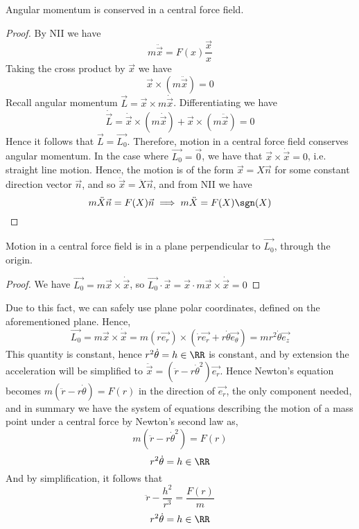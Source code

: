 \begin{theorem}
  Angular momentum is conserved in a central force field.
\end{theorem}
\begin{proof}
  By NII we have 
  \[m\ddot{\vec{x}}= F(x)\frac{\vec{x}}{x}\]
  Taking the cross product by $\vec{x}$ we have 
  \[\vec{x}\times (m\ddot{\vec{x}}) = 0\]
  Recall angular momentum $\vec{L}=\vec{x}\times m\dot{\vec{x}}$.
  Differentiating we have 
  \[\dot{\vec{L}}=\dot{\vec{x}}\times (m\dot{\vec{x}}) + \vec{x}\times
  (m\ddot{\vec{x}})=0\]
  Hence it follows that $\vec{L}=\vec{L_0}$. Therefore, motion in a central
  force field conserves angular momentum. In the case where $\vec{L_0}=\vec{0}$,
  we have that $\vec{x}\times\dot{\vec{x}}=0$, i.e. straight line motion. Hence,
  the motion is of the form $\vec{x}=X\vec{n}$ for some constant direction
  vector $\vec{n}$, and so $\ddot{\vec{x}}=\ddot{X}\vec{n}$, and from NII we
  have 
  \[m\ddot{X}\vec{n} = F(X)\vec{n} \implies m\ddot{X}=F(X)\sgn(X)\]
\end{proof}

\begin{theorem}
  Motion in a central force field is in a plane perpendicular to $\vec{L_0}$,
  through the origin.
\end{theorem}
\begin{proof}
  We have $\vec{L_0}=m\vec{x}\times\dot{\vec{x}}$, so
  $\vec{L_0}\cdot\vec{x}=\vec{x}\cdot m\vec{x}\times\dot{\vec{x}}=0$
\end{proof}
Due to this fact, we can safely use plane polar coordinates, defined on the
aforementioned plane. Hence,
\[\vec{L_0} = m\vec{x}\times \dot{\vec{x}} = m(r\vec{e_r}) \times
(\dot{r}\vec{e_r} + r\dot{\theta}\vec{e_{\theta}}) = mr^2\dot{\theta}\vec{e_z}\]
This quantity is constant, hence $r^2\dot{\theta}=h\in\RR$ is constant, and by extension
the acceleration will be simplified to $\ddot{\vec{x}} =
(\ddot{r}-r\dot{\theta}^2)\vec{e_r}$. Hence Newton's equation becomes
$m(\ddot{r}-r\dot{\theta})=F(r)$ in the direction of $\vec{e_r}$, the only
component needed, and in summary we have the system of equations describing the
motion of a mass point under a central force by Newton's second law as,
\[m(\ddot{r}-r\dot{\theta}^2)=F(r)\]
\[r^2\dot{\theta}=h\in\RR\]
And by simplification, it follows that 
\[\ddot{r}- \frac{h^2}{r^3}=\frac{F(r)}{m}\]
\[r^2\dot{\theta}=h\in\RR\]












